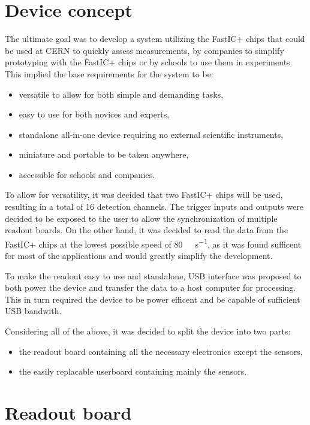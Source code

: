 
\chapter{Device concept}
The ultimate goal was to develop a system utilizing the FastIC+ chips that could be used at CERN to quickly assess measurements, by companies to simplify prototyping with the FastIC+ chips or by schools to use them in experiments. This implied the base requirements for the system to be:
\begin{itemize}
    \item versatile to allow for both simple and demanding tasks,
    \item easy to use for both novices and experts,
    \item standalone all-in-one device requiring no external scientific instruments,
    \item miniature and portable to be taken anywhere,
    \item accessible for schools and companies.
\end{itemize}

To allow for versatility, it was decided that two FastIC+ chips will be used, resulting in a total of 16 detection channels. The trigger inputs and outputs were decided to be exposed to the user to allow the synchronization of multiple readout boards. On the other hand, it was decided to read the data from the FastIC+ chips at the lowest possible speed of \SI{80}{\mega\bit\per\second}, as it was found sufficent for most of the applications and would greatly simplify the development.

To make the readout easy to use and standalone, USB interface was proposed to both power the device and transfer the data to a host computer for processing. This in turn required the device to be power efficent and be capable of sufficient USB bandwith.

Considering all of the above, it was decided to split the device into two parts: 
\begin{itemize}
    \item the readout board containing all the necessary electronics except the sensors,
    \item the easily replacable userboard containing mainly the sensors.
\end{itemize}

\chapter{Readout board}

